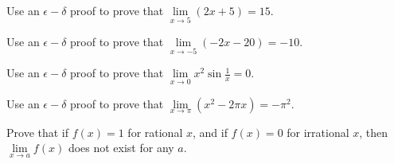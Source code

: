\documentclass[12pt,letterpaper]{hmcpset}
\begin{document}

\begin{problem}
    Use an $\epsilon-\delta$ proof to prove that $\lim\limits_{x\to 5}\left(2x+5\right) = 15$.
\end{problem}

\begin{solution}

\end{solution}
\newpage

\begin{problem}
    Use an $\epsilon-\delta$ proof to prove that $\lim\limits_{x\to -5}\left(-2x-20\right) = -10$.
\end{problem}

\begin{solution}

\end{solution}
\newpage

\begin{problem}
    Use an $\epsilon-\delta$ proof to prove that $\lim\limits_{x\to 0} x^2\sin{\frac{1}{x}} = 0$.
\end{problem}

\begin{solution}

\end{solution}
\newpage

\begin{problem}
    Use an $\epsilon-\delta$ proof to prove that $\lim\limits_{x\to \pi}\left(x^2 - 2\pi x\right) = -\pi^2$.
\end{problem}

\begin{solution}

\end{solution}
\newpage

\begin{problem}
    Prove that if $f\left(x\right) = 1$ for rational $x$, and if $f\left(x\right) = 0$ for irrational $x$, then $\lim\limits_{x\to a}f\left(x\right)$ does not exist for any $a$.
\end{problem}

\begin{solution}

\end{solution}

\end{document}
